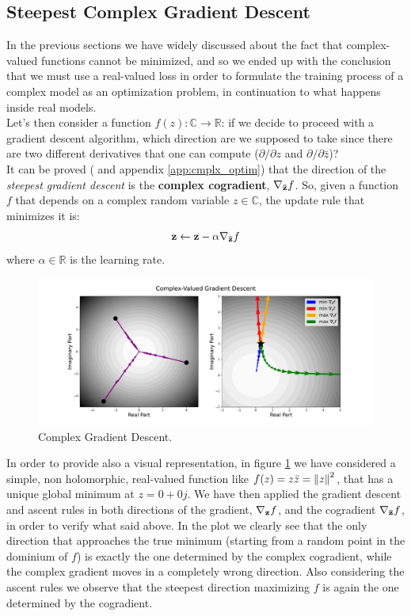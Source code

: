 \documentclass[../main.tex]{subfiles}
\begin{document}
\subsection{Steepest Complex Gradient Descent}
\label{sec:steepest_cmplx_gradient_descent}
In the previous sections we have widely discussed about the fact that complex-valued functions cannot be minimized, and so we ended up with the conclusion that we must use a real-valued loss in order to formulate the training process of a complex model as an optimization problem, in continuation to what happens inside real models.\\
Let's then consider a function $f(z):\mathds{C}\to\mathds{R}$: if we decide to proceed with a gradient descent algorithm, which direction are we supposed to take since there are two different derivatives that one can compute ($\partial/\partial z$ and $\partial/\partial \bar{z}$)?\\
It can be proved (\cite{amin_wirtinger, Hualiang_nonlinear} and appendix \ref{app:cmplx_optim}) that the direction of the \textit{steepest gradient descent} is the \textbf{complex cogradient}, $\vb{\nabla_{\bar{z}}}f$. So, given a function $f$ that depends on a complex random variable $z\in\mathds{C}$, the update rule that minimizes it is:
\begin{equation}
	\vb{z} \leftarrow \vb{z} - \alpha\vb{\nabla_{\bar{z}}}f
	\label{eq:cmplx_gradient_descent}
\end{equation}
where $\alpha\in\mathds{R}$ is the learning rate.

\begin{figure}[!ht]
	\centering
	\includegraphics[width=\textwidth]{pictures/cmplx_gradient_descent}
	\caption{Complex Gradient Descent.}
	\label{fig:cmplx_gradient_descent}
\end{figure}

In order to provide also a visual representation, in figure \ref{fig:cmplx_gradient_descent} we have considered a simple, non holomorphic, real-valued function like $f(z) = z\bar{z} = \norm{z}^2$, that has a unique global minimum at $z=0+0j$. We have then applied the gradient descent and ascent rules in both directions of the gradient, $\vb{\nabla_z}f$, and the cogradient $\vb{\nabla_{\bar{z}}}f$, in order to verify what said above. In the plot we clearly see that the only direction that approaches the true minimum (starting from a random point in the dominium of $f$) is exactly the one determined by the complex cogradient, while the complex gradient moves in a completely wrong direction. Also considering the ascent rules we observe that the steepest direction maximizing $f$ is again the one determined by the cogradient.
\end{document}
